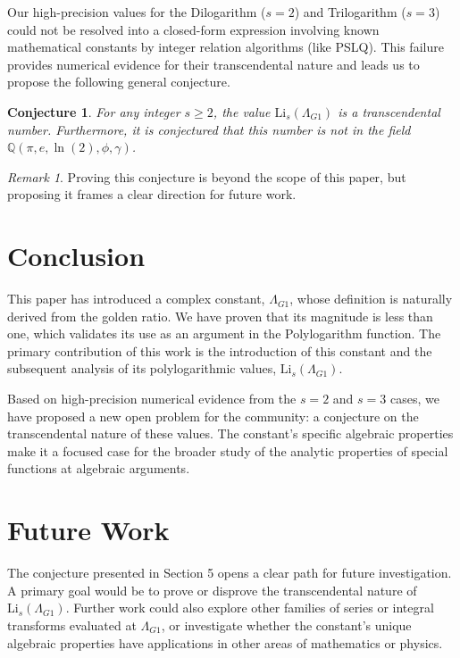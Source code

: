 \documentclass{amsart}
\theoremstyle{plain}
\newtheorem{conjecture}[theorem]{Conjecture}
\theoremstyle{definition}
\theoremstyle{remark}
\newtheorem*{remark}{Remark}
\newcommand{\LambdaG}{\Lambda_{G1}}
\begin{document}
Our high-precision values for the Dilogarithm ($s=2$) and Trilogarithm ($s=3$) could not be resolved into a closed-form expression involving known mathematical constants by integer relation algorithms (like PSLQ). This failure provides numerical evidence for their transcendental nature and leads us to propose the following general conjecture.

\begin{conjecture}
For any integer $s \ge 2$, the value $\mathrm{Li}_s(\LambdaG)$ is a transcendental number. Furthermore, it is conjectured that this number is not in the field $\mathbb{Q}(\pi, e, \ln(2), \phi, \gamma)$.
\end{conjecture}
\begin{remark}
Proving this conjecture is beyond the scope of this paper, but proposing it frames a clear direction for future work.
\end{remark}

\section{Conclusion}
This paper has introduced a complex constant, $\LambdaG$, whose definition is naturally derived from the golden ratio. We have proven that its magnitude is less than one, which validates its use as an argument in the Polylogarithm function. The primary contribution of this work is the introduction of this constant and the subsequent analysis of its polylogarithmic values, $\mathrm{Li}_s(\LambdaG)$.

Based on high-precision numerical evidence from the $s=2$ and $s=3$ cases, we have proposed a new open problem for the community: a conjecture on the transcendental nature of these values. The constant's specific algebraic properties make it a focused case for the broader study of the analytic properties of special functions at algebraic arguments.

\section{Future Work}
The conjecture presented in Section 5 opens a clear path for future investigation. A primary goal would be to prove or disprove the transcendental nature of $\mathrm{Li}_s(\LambdaG)$. Further work could also explore other families of series or integral transforms evaluated at $\LambdaG$, or investigate whether the constant's unique algebraic properties have applications in other areas of mathematics or physics.
\end{document}
